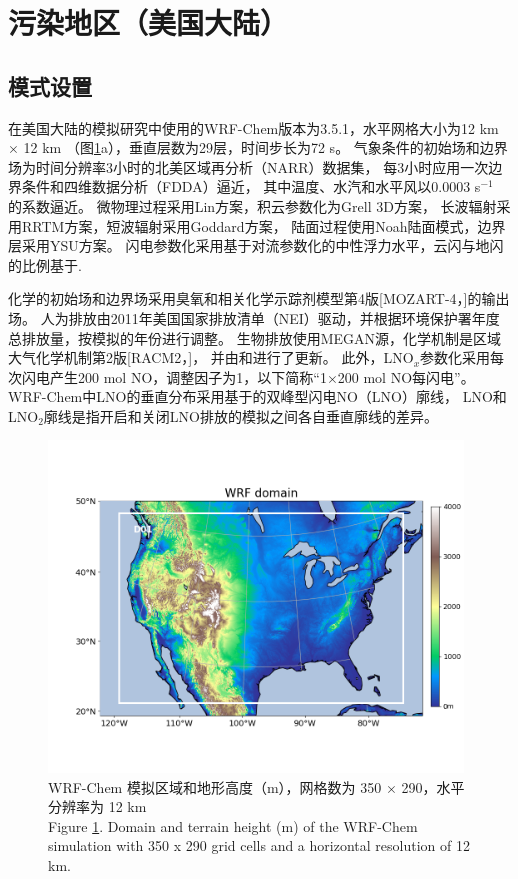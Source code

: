 \section{污染地区（美国大陆）} \label{sec:us}

\subsection{模式设置} \label{sec:model_settings_us}

在美国大陆的模拟研究中使用的WRF-Chem版本为3.5.1，水平网格大小为12 km $\times$ 12 km （图\ref{fig:us_domain}a），垂直层数为29层，时间步长为72 s。
气象条件的初始场和边界场为时间分辨率3小时的北美区域再分析（NARR）数据集，
每3小时应用一次边界条件和四维数据分析（FDDA）逼近，
其中温度、水汽和水平风以0.0003 s$^{-1}$ 的系数逼近\citep{Laughner.2017}。
微物理过程采用Lin方案\citep{Lin.1983}，积云参数化为Grell 3D方案\citep{Grell.1993a,Grell.2002a}，
长波辐射采用RRTM方案\citep{Iacono.2008}，短波辐射采用Goddard方案，
陆面过程使用Noah陆面模式\citep{Koren.1999}，边界层采用YSU方案\citep{Hong.2006}。
闪电参数化采用基于对流参数化的中性浮力水平\citep{Pickering.1992}，云闪与地闪的比例基于\citet{Boccippio.2001}.

化学的初始场和边界场采用臭氧和相关化学示踪剂模型第4版[MOZART-4，\citet{Emmons.2010}]的输出场。
人为排放由2011年美国国家排放清单（NEI）驱动，并根据环境保护署年度总排放量，按模拟的年份进行调整\citep{EPA.2015}。
生物排放使用MEGAN源，化学机制是区域大气化学机制第2版[RACM2，\citet{Goliff.2013}]，
并由\citet{Browne.2014}和\citet{Schwantes.2015}进行了更新。
此外，LNO$_x$参数化采用每次闪电产生200 mol NO，调整因子为1，以下简称“1$\times$200 mol NO每闪电”。
WRF-Chem中LNO的垂直分布采用基于\citet{Ott.2010}的双峰型闪电NO（LNO）廓线\citep{Laughner.2017}，
LNO和LNO$_2$廓线是指开启和关闭LNO排放的模拟之间各自垂直廓线的差异。


\begin{figure}[!htbp]
\centering
\includegraphics[width=11cm]{./figures/us_domain.png}
\caption{WRF-Chem 模拟区域和地形高度（m），网格数为 350 $\times$ 290，水平分辨率为 12 km \\
Figure \ref{fig:us_domain}. Domain and terrain height (m) of the WRF-Chem simulation with 350 x 290 grid cells and a horizontal resolution of 12 km.}
\label{fig:us_domain}
\end{figure}



